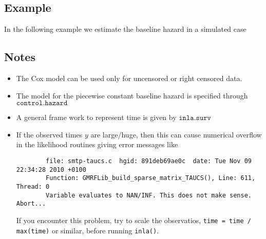 \documentclass[a4paper,11pt]{article}
\begin{document}
\subsection*{Example}

In the following example we estimate the baseline hazard in a
simulated case 

\subsection*{Notes}

\begin{itemize}
\item The Cox model can be used only for uncensored or right censored
    data.
\item The model for the piecewise constant baseline hazard is
    specified through $\texttt{control.hazard}$
\item A general frame work to represent time is given by
    $\texttt{inla.surv}$
\item If the observed times $y$ are large/huge, then this can cause
    numerical overflow in the likelihood routines giving error
    messages like
\begin{verbatim}
        file: smtp-taucs.c  hgid: 891deb69ae0c  date: Tue Nov 09 22:34:28 2010 +0100
        Function: GMRFLib_build_sparse_matrix_TAUCS(), Line: 611, Thread: 0
        Variable evaluates to NAN/INF. This does not make sense. Abort...
\end{verbatim}
    If you encounter this problem, try to scale the observatios,
    \verb|time = time / max(time)| or similar, before running
    \verb|inla()|.
\end{itemize}
\end{document}
